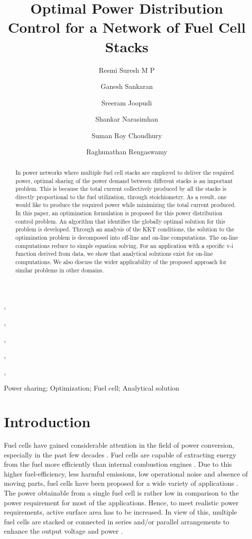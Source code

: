 \documentclass[twocolumn]{autart}
\begin{document}
\begin{frontmatter}

\title{Optimal Power Distribution Control for a Network of Fuel Cell Stacks}

\author[iitm]{Resmi Suresh M P},    \author[gdpl]{Ganesh Sankaran},               \author[gdpl]{Sreeram Joopudi},  \author[iitm]{ Shankar Narasimhan}, 
\author[nmrl]{ Suman Roy Choudhury},
\author[iitm]{Raghunathan Rengaswamy}  
\address[iitm] {Indian Institute of Technology, Madras, Chennai, Tamil Nadu, India 600036.}  
\address[gdpl] {Gyan Data Private Limited, Taramani, Chennai, India}
\address[nmrl] {Naval Materials Research Laboratory, Ambernath, India}
\begin{keyword}                           Power sharing; Optimization; Fuel cell; Analytical solution            
\end{keyword}                            

\begin{abstract}                          In power networks where multiple fuel cell stacks are employed to deliver the required power, optimal sharing of the power demand between different stacks is an important problem. This is because the total current collectively produced by all the stacks is directly proportional to the fuel utilization, through stoichiometry. As a result, one would like to produce the required power while minimizing the total current produced. In this paper, an optimization formulation is proposed for this power distribution control problem. An algorithm that identifies the globally optimal solution for this problem is developed.  Through an analysis of the KKT conditions, the solution to the optimization problem is decomposed into off-line and on-line computations. The on-line computations reduce to simple equation solving. For an application with a specific v-i function derived from data, we show that analytical solutions exist for on-line  computations. We also discuss the wider applicability of the proposed approach for similar problems in other domains.
\end{abstract}
\end{frontmatter}
\section{Introduction}
Fuel cells have gained considerable attention in the field of power conversion, especially in the past few decades \cite{rohland1992hydrogen,carrette2001fuel,spiegel2011pem}. Fuel cells are capable of extracting energy from the fuel more efficiently than internal combustion engines \cite{carrette2001fuel}. Due to this higher fuel-efficiency, less harmful emissions, low operational noise and absence of moving parts, fuel cells have been proposed for a wide variety of applications \cite{larminie2003fuel,carrette2001fuel}. The power obtainable from a single fuel cell is rather low in comparison to the power requirement for most of the applications. Hence, to meet realistic power requirements, active surface area has to be increased. In view of this, multiple fuel cells are stacked or connected in series and/or parallel arrangements to enhance the output voltage and power \cite{handbook2004eg,howstuffworks}. 
\end{document}

